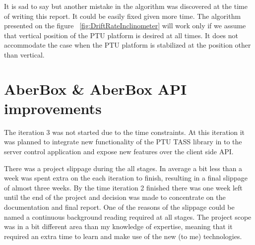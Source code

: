 It is sad to say but another mistake in the algorithm was discovered at the time of writing this report. It could be easily fixed given more time. The algorithm presented on the figure ~\ref{fig:DriftRateInclinometer} will work only if we assume that vertical position of the PTU platform is desired at all times. It does not accommodate the case when the PTU platform is stabilized at the position other than vertical.
 
 \section{AberBox \& AberBox API improvements}
 The iteration 3 was not started due to the time constraints. At this iteration it was planned to integrate new functionality of the PTU TASS library in to the server control application and expose new features over the client side API. 
 
 There was a project slippage during the all stages. In average a bit less than a week was spent extra on the each iteration to finish, resulting in a final slippage of almost three weeks. By the time iteration 2 finished there was one week left until the end of the project and decision was made to concentrate on the documentation and final report. One of the reasons of the slippage could be named a continuous background reading required at all stages. The project scope was in a bit different area than my knowledge of expertise, meaning that it required an extra time to learn and make use of the new (to me) technologies.